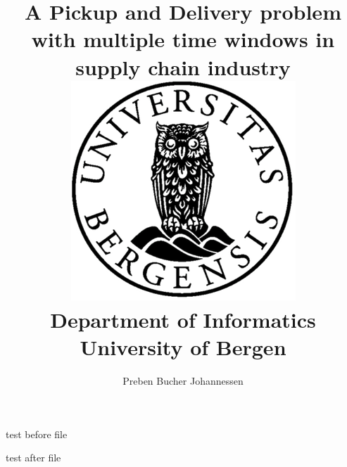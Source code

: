 \documentclass[12pt,twoside]{report}
\title{{A Pickup and Delivery problem with multiple time windows in supply chain industry}\\
{\includegraphics{uib_2.png}}\\
{\large Department of Informatics}\\
{\large University of Bergen}\\
}
\author{Preben Bucher Johannessen}
\def\biblio{}
\begin{document}
\maketitle
\def\biblio{}



\tableofcontents{}

\listoffigures{}

test before file




test after file











\appendix




\end{document}
